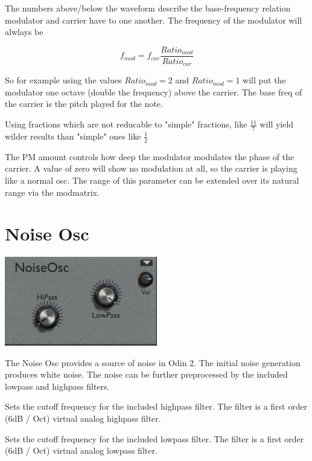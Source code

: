 The numbers above/below the waveform describe the base-frequency relation modulator and carrier have to one another. The frequency of the modulator will alwlays be

\begin{equation}
    f_{mod} = f_{car} \frac{Ratio_{mod}}{Ratio_{car}}
\end{equation}

So for example using the values $Ratio_{mod} = 2$ and $Ratio_{mod} = 1$ will put the modulator one octave (double the frequency) above the carrier. The base freq of the carrier is the pitch played for the note.

Using fractions which are not reducable to "simple" fractions, like $\frac{11}{7}$ will yield wilder results than "simple" ones like $\frac{1}{2}$

The PM amount controls how deep the modulator modulates the phase of the carrier. A value of zero will show no modulation at all, so the carrier is playing like a normal osc. The range of this parameter can be extended over its natural range via the modmatrix.

\section{Noise Osc}
\begin{center}
    \includegraphics[width=0.5\textwidth]{graphics/noise_osc.png}
\end{center}

The Noise Osc provides a source of noise in Odin 2. The initial noise generation produces white noise. The noise can be further preprocessed by the included lowpass and highpass filters.

Sets the cutoff frequency for the included highpass filter. The filter is a first order (6dB / Oct) virtual analog highpass filter.

Sets the cutoff frequency for the included lowpass filter. The filter is a first order (6dB / Oct) virtual analog lowpass filter.

